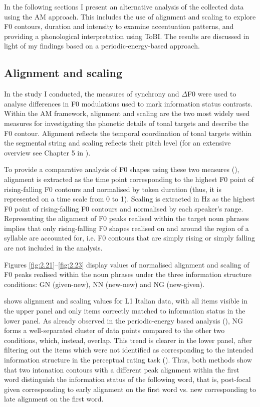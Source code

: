 In the following sections I present an alternative analysis of the collected data using the AM approach. This includes the use of alignment and scaling to explore F0 contours, duration and intensity to examine accentuation patterns, and providing a phonological interpretation using ToBI. The results are discussed in light of my findings based on a periodic-energy-based approach.

\subsection{Alignment and scaling}
\label{sec:2.8.2}
In the study I conducted, the measures of synchrony and ${\Delta}$F0 were used to analyse differences in F0 modulations used to mark information status contrasts. Within the AM framework, alignment and scaling are the two most widely used measures for investigating the phonetic details of tonal targets and describe the F0 contour. Alignment reflects the temporal coordination of tonal targets within the segmental string and scaling reflects their pitch level (for an extensive overview see Chapter 5 in \citealt{Ladd2008}).

To provide a comparative analysis of F0 shapes using these two measures (\citealt{AlbertGrice2019}), alignment is extracted as the time point corresponding to the highest F0 point of rising-falling F0 contours and normalised by token duration (thus, it is represented on a time scale from 0 to 1). Scaling is extracted in Hz as the highest F0 point of rising-falling F0 contours and normalised by each speaker’s range. Representing the alignment of F0 peaks realised within the target noun phrases implies that only rising-falling F0 shapes realised on and around the region of a syllable are accounted for, i.e. F0 contours that are simply rising or simply falling are not included in the analysis.

Figures \ref{fig:2.21}--\ref{fig:2.23} display values of normalised alignment and scaling of F0 peaks realised within the noun phrases under the three information structure conditions: GN (given-new), NN (new-new) and NG (new-given).

 shows alignment and scaling values for L1 Italian data, with all items visible in the upper panel and only items correctly matched to information status in the lower panel. As already observed in the periodic-energy based analysis (), NG forms a well-separated cluster of data points compared to the other two conditions, which, instead, overlap. This trend is clearer in the lower panel, after filtering out the items which were not identified as corresponding to the intended information structure in the perceptual rating task (). Thus, both methods show that two intonation contours with a different peak alignment within the first word distinguish the information status of the following word, that is, post-focal given corresponding to early alignment on the first word vs. new corresponding to late alignment on the first word.


